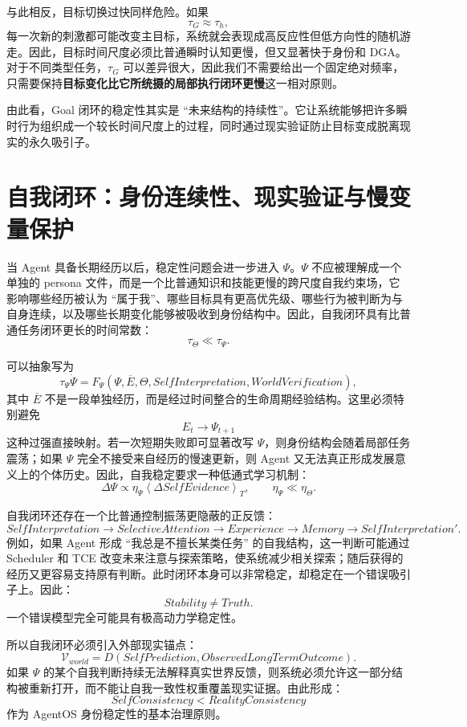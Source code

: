 与此相反，目标切换过快同样危险。如果
\[
\tau_G\approx\tau_h,
\]
每一次新的刺激都可能改变主目标，系统就会表现成高反应性但低方向性的随机游走。因此，目标时间尺度必须比普通瞬时认知更慢，但又显著快于身份和 DGA。对于不同类型任务，$\tau_G$ 可以差异很大，因此我们不需要给出一个固定绝对频率，只需要保持\textbf{目标变化比它所统摄的局部执行闭环更慢}这一相对原则。

由此看，Goal 闭环的稳定性其实是 ``未来结构的持续性''。它让系统能够把许多瞬时行为组织成一个较长时间尺度上的过程，同时通过现实验证防止目标变成脱离现实的永久吸引子。

\section{自我闭环：身份连续性、现实验证与慢变量保护}

当 Agent 具备长期经历以后，稳定性问题会进一步进入 $\Psi$。$\Psi$ 不应被理解成一个单独的 persona 文件，而是一个比普通知识和技能更慢的跨尺度自我约束场，它影响哪些经历被认为 ``属于我''、哪些目标具有更高优先级、哪些行为被判断为与自身连续，以及哪些长期变化能够被吸收到身份结构中。因此，自我闭环具有比普通任务闭环更长的时间常数：
\[
\tau_\Theta
\ll
\tau_\Psi.
\]

可以抽象写为
\[
\tau_\Psi\dot\Psi
=
F_\Psi
\left(
\Psi,
\overline E,
\Theta,
SelfInterpretation,
WorldVerification
\right),
\]
其中 $\overline E$ 不是一段单独经历，而是经过时间整合的生命周期经验结构。这里必须特别避免
\[
E_t\rightarrow\Psi_{t+1}
\]
这种过强直接映射。若一次短期失败即可显著改写 $\Psi$，则身份结构会随着局部任务震荡；如果 $\Psi$ 完全不接受来自经历的慢速更新，则 Agent 又无法真正形成发展意义上的个体历史。因此，自我稳定要求一种低通式学习机制：
\[
\Delta\Psi
\propto
\eta_\Psi
\left\langle
\Delta SelfEvidence
\right\rangle_T,
\qquad
\eta_\Psi\ll\eta_\Theta.
\]

自我闭环还存在一个比普通控制振荡更隐蔽的正反馈：
\[
SelfInterpretation
\rightarrow
SelectiveAttention
\rightarrow
Experience
\rightarrow
Memory
\rightarrow
SelfInterpretation'.
\]
例如，如果 Agent 形成 ``我总是不擅长某类任务'' 的自我结构，这一判断可能通过 Scheduler 和 TCE 改变未来注意与探索策略，使系统减少相关探索；随后获得的经历又更容易支持原有判断。此时闭环本身可以非常稳定，却稳定在一个错误吸引子上。因此：
\[
\boxed{
Stability\neq Truth.
}
\]
一个错误模型完全可能具有极高动力学稳定性。

所以自我闭环必须引入外部现实锚点：
\[
\mathcal V_{world}
=
D
\left(
SelfPrediction,
ObservedLongTermOutcome
\right).
\]
如果 $\Psi$ 的某个自我判断持续无法解释真实世界反馈，则系统必须允许这一部分结构被重新打开，而不能让自我一致性权重覆盖现实证据。由此形成：
\[
\boxed{
SelfConsistency
<
RealityConsistency
}
\]
作为 AgentOS 身份稳定性的基本治理原则。

